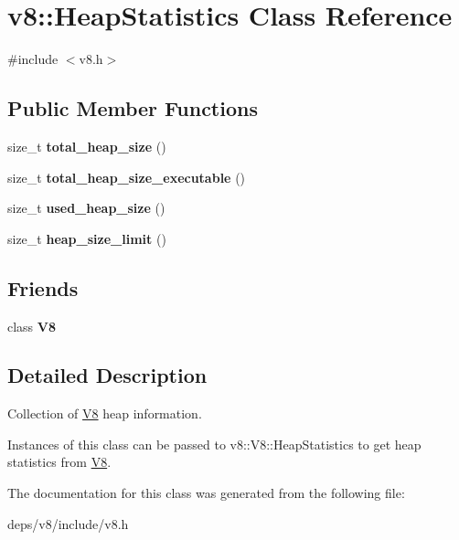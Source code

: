 \hypertarget{classv8_1_1_heap_statistics}{}\section{v8\+:\+:Heap\+Statistics Class Reference}
\label{classv8_1_1_heap_statistics}


{\ttfamily \#include $<$v8.\+h$>$}

\subsection*{Public Member Functions}
\begin{DoxyCompactItemize}
\item 
\hypertarget{classv8_1_1_heap_statistics_ac005b9c55d5818b6969c8fd61359139b}{}size\+\_\+t {\bfseries total\+\_\+heap\+\_\+size} ()\label{classv8_1_1_heap_statistics_ac005b9c55d5818b6969c8fd61359139b}

\item 
\hypertarget{classv8_1_1_heap_statistics_aa935ea51c12ec64049c06b532dbb4f8d}{}size\+\_\+t {\bfseries total\+\_\+heap\+\_\+size\+\_\+executable} ()\label{classv8_1_1_heap_statistics_aa935ea51c12ec64049c06b532dbb4f8d}

\item 
\hypertarget{classv8_1_1_heap_statistics_a05ecb48bceea49d2fe430c81df02babc}{}size\+\_\+t {\bfseries used\+\_\+heap\+\_\+size} ()\label{classv8_1_1_heap_statistics_a05ecb48bceea49d2fe430c81df02babc}

\item 
\hypertarget{classv8_1_1_heap_statistics_a27e5a1ba9bc8530c6bf1cf277ce3d179}{}size\+\_\+t {\bfseries heap\+\_\+size\+\_\+limit} ()\label{classv8_1_1_heap_statistics_a27e5a1ba9bc8530c6bf1cf277ce3d179}

\end{DoxyCompactItemize}
\subsection*{Friends}
\begin{DoxyCompactItemize}
\item 
\hypertarget{classv8_1_1_heap_statistics_a51a1fbf409294cf02a99a020ac94a763}{}class {\bfseries V8}\label{classv8_1_1_heap_statistics_a51a1fbf409294cf02a99a020ac94a763}

\end{DoxyCompactItemize}


\subsection{Detailed Description}
Collection of \hyperlink{classv8_1_1_v8}{V8} heap information.

Instances of this class can be passed to v8\+::\+V8\+::\+Heap\+Statistics to get heap statistics from \hyperlink{classv8_1_1_v8}{V8}. 

The documentation for this class was generated from the following file\+:\begin{DoxyCompactItemize}
\item 
deps/v8/include/v8.\+h\end{DoxyCompactItemize}
